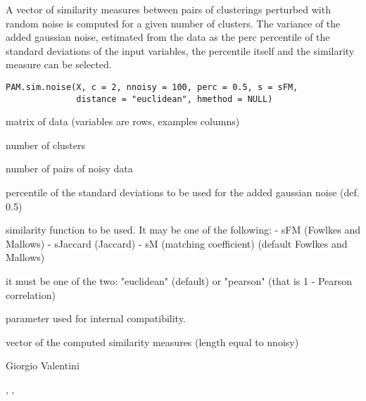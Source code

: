 \documentclass{article}
\begin{document}
\begin{Description}\relax
A vector of similarity measures between pairs of clusterings perturbed with random noise is computed for a given number of clusters. 
The variance of the added gaussian noise, estimated from the data as the perc percentile of the standard deviations of the input variables,
the percentile itself and the similarity measure can be selected.
\end{Description}
\begin{Usage}
\begin{verbatim}
PAM.sim.noise(X, c = 2, nnoisy = 100, perc = 0.5, s = sFM, 
              distance = "euclidean", hmethod = NULL)
\end{verbatim}
\end{Usage}
\begin{Arguments}
\begin{ldescription}
\item[\code{X}] matrix of data (variables are rows, examples columns) 
\item[\code{c}] number of clusters 
\item[\code{nnoisy}] number of pairs of noisy data 
\item[\code{perc}] percentile of the standard deviations to be used for the added gaussian noise (def. 0.5) 
\item[\code{s}] similarity function to be used. It may be one of the following: 
- sFM (Fowlkes and Mallows)
- sJaccard (Jaccard)
- sM (matching coefficient)
(default Fowlkes and Mallows) 
\item[\code{distance}] it must be one of the two: "euclidean" (default) or "pearson" (that is 1 - Pearson correlation) 
\item[\code{hmethod}] parameter used for internal compatibility. 
\end{ldescription}
\end{Arguments}
\begin{Value}
vector of the computed similarity measures (length equal to nnoisy)
\end{Value}
\begin{Author}\relax
Giorgio Valentini 
\end{Author}
\begin{SeeAlso}\relax
{}, , 
\end{SeeAlso}
\end{document}
